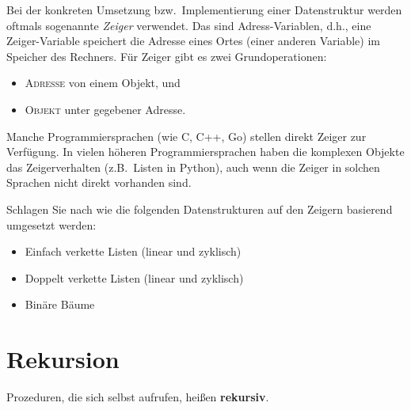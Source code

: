 \begin{bem} 
Bei der konkreten Umsetzung bzw.~Implementierung einer Datenstruktur werden oftmals sogenannte \emph{Zeiger} verwendet.
Das sind Adress-Variablen, d.h., eine Zeiger-Variable speichert die Adresse eines Ortes (einer anderen Variable) im Speicher des Rechners.
Für Zeiger gibt es zwei Grundoperationen: 
\begin{itemize}
	\item \textsc{Adresse} von einem Objekt, und 
	\item \textsc{Objekt} unter gegebener Adresse.
\end{itemize} 	
Manche Programmiersprachen (wie C, C++, Go) stellen direkt Zeiger zur Verfügung. 
	 In vielen höheren Programmiersprachen haben die komplexen Objekte das Zeigerverhalten (z.B.~Listen in Python), auch wenn die Zeiger in solchen Sprachen nicht direkt vorhanden sind. 
\end{bem} 


\begin{aufg} 
	Schlagen Sie nach wie die folgenden Datenstrukturen auf den Zeigern basierend umgesetzt werden: 
	\begin{itemize}
			\item Einfach verkette Listen (linear und zyklisch)
			\item Doppelt verkette Listen  (linear und zyklisch)
			\item Binäre Bäume
	\end{itemize} 
\end{aufg} 

\section{Rekursion}


\begin{defn}
	Prozeduren, die sich selbst aufrufen, heißen \textbf{rekursiv}. 
\end{defn} 

